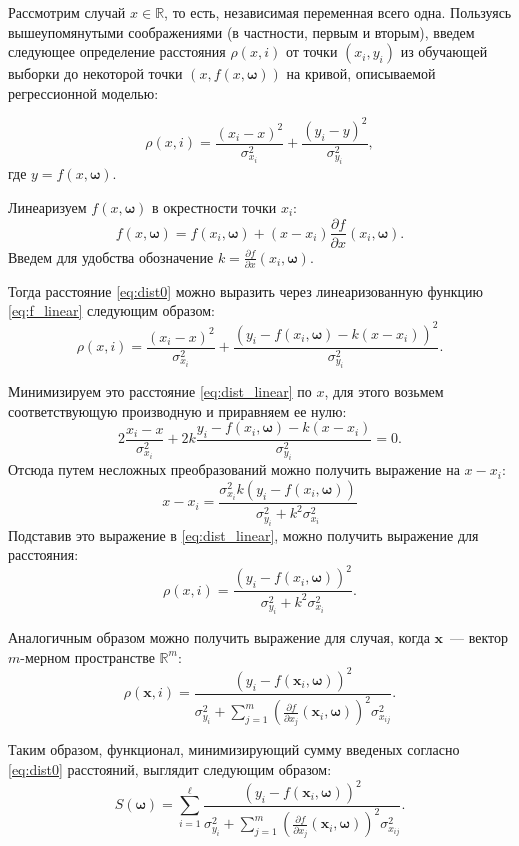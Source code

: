 \documentclass[11pt,a4paper]{article}
\newcommand{\bomega}{\boldsymbol{\omega}}
\begin{document}
Рассмотрим случай $x \in \mathbb{R}$, то есть, независимая переменная всего одна.
Пользуясь вышеупомянутыми соображениями (в частности, первым и вторым), введем
следующее определение расстояния $\rho(x, i)$ от точки $(x_i, y_i)$ из обучающей выборки до
некоторой точки $(x, f(x, \bomega))$ на кривой, описываемой регрессионной моделью:

\begin{equation}
  \rho(x, i) = \frac{(x_i - x)^2}{\sigma_{x_i}^2} + \frac{(y_i - y)^2}{\sigma_{y_i}^2},
  \label{eq:dist0}
\end{equation}
где $y = f(x, \bomega)$.

Линеаризуем $f(x, \bomega)$ в окрестности точки $x_i$:
\begin{equation}
  f(x, \bomega) = f(x_i, \bomega) + (x - x_i) \frac{\partial f}{\partial x}(x_i, \bomega).
  \label{eq:f_linear}
\end{equation}
Введем для удобства обозначение $k = \frac{\partial f}{\partial x}(x_i, \bomega)$.

Тогда расстояние \eqref{eq:dist0} можно выразить через линеаризованную функцию
\eqref{eq:f_linear} следующим образом:
\begin{equation}
  \rho(x, i) = \frac{(x_i - x)^2}{\sigma_{x_i}^2} + \frac{(y_i - f(x_i, \bomega) - k (x - x_i))^2}{\sigma_{y_i}^2}.
  \label{eq:dist_linear}
\end{equation}

Минимизируем это расстояние \eqref{eq:dist_linear} по $x$, для этого возьмем
соответствующую производную и приравняем ее нулю:
\[
  2\frac{x_i - x}{\sigma_{x_i}^2} + 2k\frac{y_i - f(x_i, \bomega) - k (x - x_i)}{\sigma_{y_i}^2} = 0.
\]
Отсюда путем несложных преобразований можно получить выражение на $x - x_i$:
\[
  x - x_i = \frac{\sigma^2_{x_i} k (y_i - f(x_i, \bomega))}{\sigma^2_{y_i} + k^2 \sigma^2_{x_i}}
\]
Подставив это выражение в \eqref{eq:dist_linear}, можно получить выражение
для расстояния:
\[
  \rho(x, i) = \frac{(y_i - f(x_i, \bomega))^2}{\sigma^2_{y_i} + k^2 \sigma^2_{x_i}}.
\]

Аналогичным образом можно получить выражение для случая, когда $\mathbf{x}$~---
вектор $m$-мерном пространстве $\mathbb{R}^m$:
\[
  \rho(\mathbf{x}, i) = \frac{(y_i - f(\mathbf{x}_i, \bomega))^2}{\sigma_{y_i}^2 + \sum_{j = 1}^m (\frac{\partial f}{\partial x_j}(\mathbf{x}_i, \bomega))^2 \sigma^2_{x_{ij}}}.
\]

Таким образом, функционал, минимизирующий сумму введеных согласно \eqref{eq:dist0}
расстояний, выглядит следующим образом:
\begin{equation}
  S(\bomega) = \sum_{i = 1}^\ell \frac{(y_i - f(\mathbf{x}_i, \bomega))^2}{\sigma_{y_i}^2 + \sum_{j = 1}^m (\frac{\partial f}{\partial x_j}(\mathbf{x}_i, \bomega))^2 \sigma^2_{x_{ij}}}.
  \label{eq:s}
\end{equation}
\end{document}
